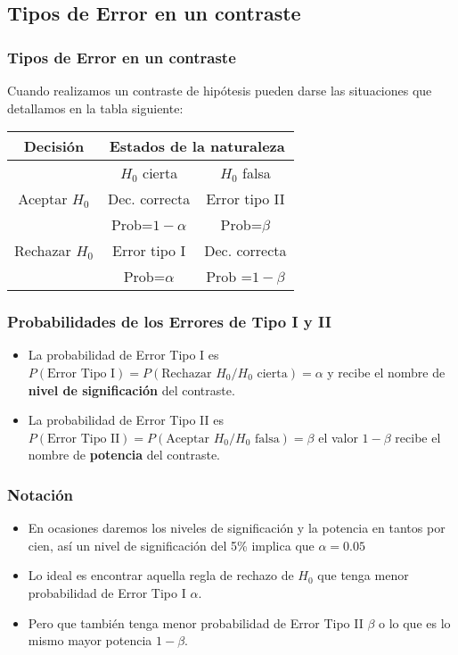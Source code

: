  \subsection{Tipos de Error en un contraste}
\begin{frame}

 \frametitle{Tipos de Error en un contraste}
Cuando realizamos un contraste de hipótesis pueden darse las situaciones que detallamos en la tabla siguiente:
\begin{center}
    \begin{tabular}{c|c|c}
    Decisión  & \multicolumn{2}{c}{Estados de la naturaleza} \\
    \hline\hline
     & $H_{0}$ cierta & $H_{0}$ falsa\\
     \hline
    Aceptar $H_{0}$ & Dec. correcta  &  Error tipo II \\
    & Prob=$1-\alpha$ & Prob=$\beta$\\
    \hline
    Rechazar $H_{0}$ & Error tipo I  & Dec. correcta \\
    &Prob=$\alpha$ & Prob =$1-\beta$\\
\hline
    \end{tabular}
\end{center}
\end{frame}

\begin{frame}
\frametitle{Probabilidades de los Errores de Tipo I y II}
\begin{itemize}
\item La probabilidad de Error Tipo I es
$P(\mbox{Error Tipo I})=P(\mbox{Rechazar } H_{0}/H_{0} \mbox{ cierta})=\alpha$ y recibe el nombre de \textbf{nivel de significación} del contraste.
\item La probabilidad de Error Tipo II es
$P(\mbox{Error Tipo II})=P(\mbox{Aceptar } H_{0}/H_{0} \mbox{ falsa})=\beta$ el valor $1-\beta$ recibe el nombre de \textbf{potencia} del contraste.
\end{itemize}
\end{frame}

\begin{frame}
\frametitle{Notación}
\begin{itemize}
\item En ocasiones daremos los niveles de significación y  la potencia en tantos por cien, así
un nivel de significación del 5\% implica que $\alpha=0.05$
\item Lo ideal es encontrar aquella regla de rechazo de $H_{0}$ que tenga menor probabilidad de Error Tipo I $\alpha$.
\item Pero que también tenga menor probabilidad de Error Tipo II $\beta$ o lo que es lo mismo mayor potencia $1-\beta$.

\end{itemize}
\end{frame}

